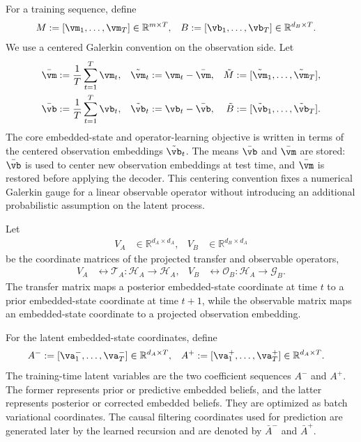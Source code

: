 \documentclass[twoside,11pt]{article}
\begin{document}
For a training sequence, define
\begin{align}
M
&:=
[\vm_1,\dots,\vm_T]
\in\mathbb R^{m\times T},
&
B
&:=
[\vb_1,\dots,\vb_T]
\in\mathbb R^{d_B\times T}.
\label{eq:M_B_observation_matrices}
\end{align}
We use a centered Galerkin convention on the observation side. Let
\begin{align}
\bar{\vm}
&:=
\frac1T\sum_{t=1}^T\vm_t,
&
\tilde{\vm}_t
&:=
\vm_t-\bar{\vm},
&
\tilde M
&:=
[\tilde{\vm}_1,\dots,\tilde{\vm}_T],
\label{eq:centered_encoder_feature_matrix}
\\
\bar{\vb}
&:=
\frac1T\sum_{t=1}^T\vb_t,
&
\tilde{\vb}_t
&:=
\vb_t-\bar{\vb},
&
\tilde B
&:=
[\tilde{\vb}_1,\dots,\tilde{\vb}_T].
\label{eq:centered_observation_embedding_matrix}
\end{align}
The core embedded-state and operator-learning objective is written in
terms of the centered observation embeddings $\tilde{\vb}_t$. The means
$\bar{\vb}$ and $\bar{\vm}$ are stored: $\bar{\vb}$ is used to center
new observation embeddings at test time, and $\bar{\vm}$ is restored
before applying the decoder. This centering convention fixes a numerical
Galerkin gauge for a linear observable operator without introducing an
additional probabilistic assumption on the latent process.

Let
\begin{align}
V_A
&\in\mathbb R^{d_A\times d_A},
&
V_B
&\in\mathbb R^{d_B\times d_A}
\label{eq:finite_operator_matrices_revised}
\end{align}
be the coordinate matrices of the projected transfer and observable
operators,
\begin{align}
V_A
&\leftrightarrow
\mathcal T_A:\mathcal H_A\to\mathcal H_A,
&
V_B
&\leftrightarrow
\mathcal O_B:\mathcal H_A\to\mathcal G_B.
\label{eq:operator_matrix_correspondence}
\end{align}
The transfer matrix maps a posterior embedded-state coordinate at time
$t$ to a prior embedded-state coordinate at time $t+1$, while the
observable matrix maps an embedded-state coordinate to a projected
observation embedding.

For the latent embedded-state coordinates, define
\begin{align}
A^-
&:=
[\va_1^-,\dots,\va_T^-]
\in\mathbb R^{d_A\times T},
&
A^+
&:=
[\va_1^+,\dots,\va_T^+]
\in\mathbb R^{d_A\times T}.
\label{eq:A_minus_A_plus_matrices}
\end{align}
The training-time latent variables are the two coefficient sequences
$A^-$ and $A^+$. The former represents prior or predictive embedded
beliefs, and the latter represents posterior or corrected embedded
beliefs. They are optimized as batch variational coordinates. The
causal filtering coordinates used for prediction are generated later by
the learned recursion and are denoted by $\bar A^-$ and $\bar A^+$.
\end{document}
